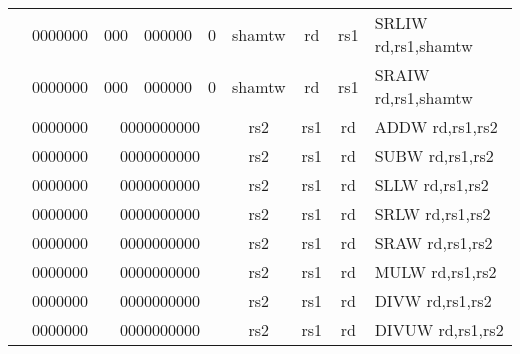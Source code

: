 \begin{table}[p]
\begin{small}
\begin{center}
\begin{tabular}{rcccccccccl}
&
\multicolumn{1}{|c|}{0000000} &
\multicolumn{2}{c|}{000} &
\multicolumn{2}{c|}{000000} &
\multicolumn{1}{c|}{0} &
\multicolumn{1}{c|}{shamtw} &
\multicolumn{1}{c|}{rd} &
\multicolumn{1}{c|}{rs1} & SRLIW rd,rs1,shamtw \\
\cline{2-10}
  

&
\multicolumn{1}{|c|}{0000000} &
\multicolumn{2}{c|}{000} &
\multicolumn{2}{c|}{000000} &
\multicolumn{1}{c|}{0} &
\multicolumn{1}{c|}{shamtw} &
\multicolumn{1}{c|}{rd} &
\multicolumn{1}{c|}{rs1} & SRAIW rd,rs1,shamtw \\
\cline{2-10}
  

&
\multicolumn{1}{|c|}{0000000} &
\multicolumn{5}{c|}{0000000000} &
\multicolumn{1}{c|}{rs2} &
\multicolumn{1}{c|}{rs1} &
\multicolumn{1}{c|}{rd} & ADDW rd,rs1,rs2 \\
\cline{2-10}
  

&
\multicolumn{1}{|c|}{0000000} &
\multicolumn{5}{c|}{0000000000} &
\multicolumn{1}{c|}{rs2} &
\multicolumn{1}{c|}{rs1} &
\multicolumn{1}{c|}{rd} & SUBW rd,rs1,rs2 \\
\cline{2-10}
  

&
\multicolumn{1}{|c|}{0000000} &
\multicolumn{5}{c|}{0000000000} &
\multicolumn{1}{c|}{rs2} &
\multicolumn{1}{c|}{rs1} &
\multicolumn{1}{c|}{rd} & SLLW rd,rs1,rs2 \\
\cline{2-10}
  

&
\multicolumn{1}{|c|}{0000000} &
\multicolumn{5}{c|}{0000000000} &
\multicolumn{1}{c|}{rs2} &
\multicolumn{1}{c|}{rs1} &
\multicolumn{1}{c|}{rd} & SRLW rd,rs1,rs2 \\
\cline{2-10}
  

&
\multicolumn{1}{|c|}{0000000} &
\multicolumn{5}{c|}{0000000000} &
\multicolumn{1}{c|}{rs2} &
\multicolumn{1}{c|}{rs1} &
\multicolumn{1}{c|}{rd} & SRAW rd,rs1,rs2 \\
\cline{2-10}
  

&
\multicolumn{1}{|c|}{0000000} &
\multicolumn{5}{c|}{0000000000} &
\multicolumn{1}{c|}{rs2} &
\multicolumn{1}{c|}{rs1} &
\multicolumn{1}{c|}{rd} & MULW rd,rs1,rs2 \\
\cline{2-10}
  

&
\multicolumn{1}{|c|}{0000000} &
\multicolumn{5}{c|}{0000000000} &
\multicolumn{1}{c|}{rs2} &
\multicolumn{1}{c|}{rs1} &
\multicolumn{1}{c|}{rd} & DIVW rd,rs1,rs2 \\
\cline{2-10}
  

&
\multicolumn{1}{|c|}{0000000} &
\multicolumn{5}{c|}{0000000000} &
\multicolumn{1}{c|}{rs2} &
\multicolumn{1}{c|}{rs1} &
\multicolumn{1}{c|}{rd} & DIVUW rd,rs1,rs2 \\
\cline{2-10}
  


\end{tabular}
\end{center}
\end{small}
\end{table}

